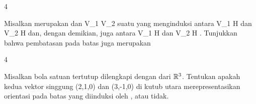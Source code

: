 {4}
{

Misalkan
merupakan
dan
\maabbdisp {\varphi} {V_1 } { V_2
} {}
suatu
yang menginduksi
antara
\mathkor {} {V_1 \cap H} {dan} {V_2 \cap H} {}
dan, dengan demikian, juga antara
\mathkor {} {V_1 \cap \partial H} {dan} {V_2 \cap \partial H} {}
 {} {.}
Tunjukkan bahwa pembatasan pada batas juga merupakan

}
{} {}

{4}
{

Misalkan bola satuan tertutup
 dilengkapi dengan
 dari ${\mathbb R}^3$. Tentukan apakah kedua vektor singgung
\mathkor {} {(2,1,0)} {dan} {(3,-1,0)} {}
di kutub utara
 merepresentasikan orientasi pada batas yang diinduksi oleh
 {} {,}
atau tidak.

}
{} {}
